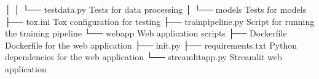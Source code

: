 \documentclass[letterpaper,10pt,english]{sphinxmanual}
\begin{document}
\begin{sphinxVerbatim}[commandchars=\\\{\}]
│   │   └── test\PYGZus{}data.py     \PYGZlt{}\PYGZhy{}\PYGZhy{}\PYGZhy{} Tests for data processing
│   └── models                 \PYGZlt{}\PYGZhy{}\PYGZhy{}\PYGZhy{} Tests for models
├── tox.ini                \PYGZlt{}\PYGZhy{}\PYGZhy{}\PYGZhy{} Tox configuration for testing
├── train\PYGZus{}pipeline.py      \PYGZlt{}\PYGZhy{}\PYGZhy{}\PYGZhy{} Script for running the training pipeline
└── web\PYGZus{}app                \PYGZlt{}\PYGZhy{}\PYGZhy{}\PYGZhy{} Web application scripts
    ├── Dockerfile         \PYGZlt{}\PYGZhy{}\PYGZhy{}\PYGZhy{} Dockerfile for the web application
    ├── \PYGZus{}\PYGZus{}init\PYGZus{}\PYGZus{}.py
    ├── requirements.txt  \PYGZlt{}\PYGZhy{}\PYGZhy{}\PYGZhy{} Python dependencies for the web application
    └── streamlit\PYGZus{}app.py    \PYGZlt{}\PYGZhy{}\PYGZhy{}\PYGZhy{} Streamlit web application
\end{sphinxVerbatim}
\end{document}
